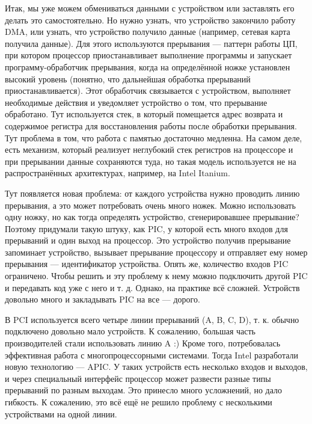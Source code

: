 \documentclass[main.tex]{subfiles}
\begin{document}
Итак, мы уже можем обмениваться данными с устройством или заставлять его
делать это самостоятельно. Но нужно узнать, что устройство закончило работу
DMA, или узнать, что устройство получило данные (например, сетевая карта
получила данные). Для этого используются прерывания --- паттерн работы
ЦП, при котором процессор приостанавливает выполнение программы и запускает
программу-обработчик прерывания, когда на определённой ножке установлен
высокий уровень (понятно, что дальнейшая обработка прерываний приостанавливается).
Этот обработчик связывается с устройством, выполняет необходимые действия
и уведомляет устройство о том, что прерывание обработано.
Тут используется стек, в который помещается адрес возврата и содержимое регистра
для восстановления работы после обработки прерывания. Тут проблема в том, что
работа с памятью достаточно медленна. На самом деле, есть механизм, который
реализует неглубокий стек регистров на процессоре и при прерывании данные
сохраняются туда, но такая модель используется не на распространённых архитектурах,
например, на Intel Itanium.

Тут появляется новая проблема: от каждого устройства нужно проводить линию
прерывания, а это может потребовать очень много ножек. Можно использовать одну
ножку, но как тогда определять устройство, сгенерировавшее прерывание?
Поэтому придумали такую штуку, как PIC, у которой есть много входов для
прерываний и один выход на процессор. Это устройство получив прерывание
запоминает устройство, вызывает прерывание процессору и отправляет ему
номер прерывания --- идентификатор устройства.
Опять же, количество входов PIC ограничено. Чтобы решить и эту проблему
к нему можно подключить другой PIC и передавать код уже с него и т. д.
Однако, на практике всё сложней. Устройств довольно много и закладывать
PIC на все --- дорого.

В PCI используется всего четыре линии прерываний (A, B, C, D), т.  к.
обычно подключено довольно мало устройств. К сожалению, большая часть
производителей стали использовать линию A :)
Кроме того, потребовалась эффективная работа с многопроцессорными системами.
Тогда Intel разработали новую технологию --- APIC. У таких устройств есть
несколько входов и выходов, и через специальный интерфейс процессор
может развести разные типы прерываний по разным выходам. Это принесло много
усложнений, но дало гибкость.
К сожалению, это всё ещё не решило проблему с несколькими устройствами
на одной линии.
\end{document}
